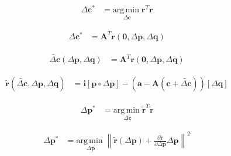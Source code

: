 \begin{equation}
    \begin{aligned}
        \Delta\mathbf{c}^* & = \underset{\Delta\mathbf{c}}{\mathrm{arg\,min\;}} \mathbf{r}^T\mathbf{r}
    \label{eq:ssd_appearance}
    \end{aligned}
\end{equation}

\begin{equation}
    \begin{aligned}
        \Delta \mathbf{c}^* & = \mathbf{A}^T \mathbf{r}(\mathbf{0}, \Delta \mathbf{p}, \Delta \mathbf{q})
    \label{eq:wiberg_appearance}
    \end{aligned}
\end{equation}


\begin{equation}
    \begin{aligned}
        \tilde{\Delta \mathbf{c}}(\Delta \mathbf{p}, \Delta \mathbf{q}) & = \mathbf{A}^T \mathbf{r}(\mathbf{0}, \Delta \mathbf{p}, \Delta \mathbf{q})
    \label{eq:wiberg_appearance}
    \end{aligned}
\end{equation}

\begin{equation}
    \begin{aligned}
        \tilde{\mathbf{r}}(\tilde{\Delta \mathbf{c}}, \Delta \mathbf{p}, \Delta \mathbf{q}) & = \mathbf{i}[\mathbf{p} \circ \Delta \mathbf{p}] - (\mathbf{a} - \mathbf{A}(\mathbf{c} + \tilde{\Delta \mathbf{c}}))[\Delta \mathbf{q}]
    \label{eq:wiberg_appearance}
    \end{aligned}
\end{equation}

\begin{equation}
    \begin{aligned}
        \Delta\mathbf{p}^* & = \underset{\Delta\mathbf{c}}{\mathrm{arg\,min\;}} \tilde{\mathbf{r}}^T\tilde{\mathbf{r}}
    \label{eq:ssd_appearance}
    \end{aligned}
\end{equation}

\begin{equation}
    \begin{aligned}
        \Delta\mathbf{p}^* & = \underset{\Delta\mathbf{p}}{\mathrm{arg\,min\;}}  \left\| \tilde{\mathbf{r}}(\Delta\mathbf{p}) + \frac{\partial\tilde{\mathbf{r}}}{\partial\Delta\mathbf{p}} \Delta\mathbf{p} \right\|^2
    \label{eq:ssd_appearance}
    \end{aligned}
\end{equation}

